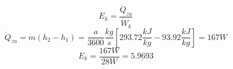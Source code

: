

\item[d)] \[
    E_k = \frac{\dot{Q}_{zu}}{\dot{W}_k}
    \]
    \[
    \dot{Q}_{zu} = \dot{m} (h_2 - h_1) = \frac{a}{3600} \frac{kg}{s} \left[ 293.72 \frac{kJ}{kg} - 93.92 \frac{kJ}{kg} \right] = 167 W
    \]
    \[
    E_k = \frac{167 W}{28 W} = \underline{5.9693}
    \]